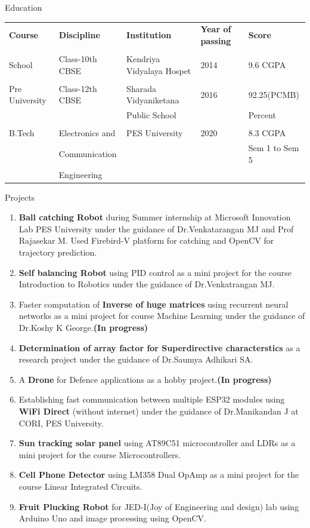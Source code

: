 \documentclass{resume} %
\begin{document}
\begin{rSection}{Education}
\centering
\begin{tabular}{|l|l|l|l|l|}
\hline
{\bf Course} & {\bf Discipline} & {\bf Institution} & {\bf Year of passing} & {\bf Score} \\
&&&&\\
\hline
 School & Class-10th CBSE & Kendriya Vidyalaya Hospet & 2014 & 9.6 CGPA\\
 &&&&\\
 \hline
 Pre University & Class-12th CBSE & Sharada Vidyaniketana & 2016 & 92.25(PCMB)\\
  & & Public School & &Percent\\
  &&&&\\
  \hline
  B.Tech & Electronics and & PES University & 2020 & 8.3 CGPA\\
  &Communication&&&Sem 1 to Sem 5\\
  & Engineering&&&\\
  \hline
\end{tabular}
\end{rSection}

\pagebreak

\begin{rSection}{Projects}
\begin{enumerate}
    \item {\bf Ball catching Robot} during Summer internship at Microsoft Innovation Lab PES University under the guidance of Dr.Venkatarangan MJ and Prof Rajasekar M. Used Firebird-V platform for catching and OpenCV for trajectory prediction.
    \item {\bf Self balancing Robot} using PID control as a mini project for the course Introduction to Robotics under the guidance of Dr.Venkatrangan MJ.
    \item Faster computation of {\bf Inverse of huge matrices} using recurrent neural networks as a mini project for course Machine Learning under the guidance of Dr.Koshy K George.{\bf (In progress)}
    \item {\bf Determination of array factor for Superdirective characterstics} as a research project under the guidance of Dr.Saumya Adhikari SA.
    \item A {\bf Drone} for Defence applications as a hobby project.{\bf (In progress)}
    \item Establishing fast communication between multiple ESP32 modules using {\bf WiFi Direct} (without internet)  under the guidance of Dr.Manikandan J at CORI, PES University.
    \item {\bf Sun tracking solar panel} using AT89C51 microcontroller and LDRs as a mini project for the course Microcontrollers.
    \item {\bf Cell Phone Detector} using LM358 Dual OpAmp as a mini project for the course Linear Integrated Circuits.
    \item {\bf Fruit Plucking Robot} for JED-I(Joy of Engineering and design) lab using Arduino Uno and image processing using OpenCV.
\end{enumerate}
\end{rSection}
\end{document}
